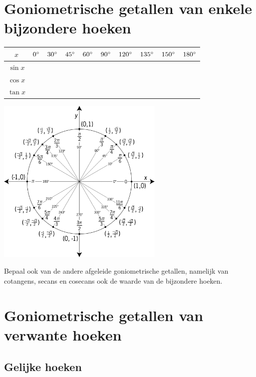 \documentclass[a4paper,12pt]{article}
\begin{document}
\section{Goniometrische getallen van enkele bijzondere hoeken}
\begin{center}
  \begin{tabular}{c|c|c|c|c|c|c|c|c|c}
    $x$ & $0^\circ$ & $30^\circ$ & $45^\circ$ & $60^\circ$ & $90^\circ$ & $120^\circ$ & $135^\circ$ & $150^\circ$ & $180^\circ$ \\
    \hline
    $\sin x$&&&&&&&&&\\
    \hline
    $\cos x$&&&&&&&&&\\
    \hline
    $\tan x$&&&&&&&&&\\ 
  \end{tabular}
  \vspace*{2cm}\mbox{}
  \includegraphics[width=0.6\textwidth]{unit-circle} %
  \vspace*{1cm}
\end{center}

\begin{oefening}
Bepaal ook van de andere afgeleide goniometrische getallen, namelijk van cotangens, secans en cosecans ook de waarde van de bijzondere hoeken.
\end{oefening}


\pagebreak
\section{Goniometrische getallen van verwante hoeken}

\subsection{Gelijke hoeken}
\end{document}
